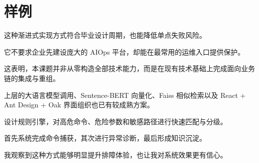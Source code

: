 \section{样例}

这种渐进式实现方式符合毕业设计周期，也能降低单点失败风险。

它不要求企业先建设庞大的 AIOps 平台，却能在最常用的运维入口提供保护。

这表明，本课题并非从零构造全部技术能力，而是在现有技术基础上完成面向业务链的集成与重组。

上层的大语言模型调用、Sentence-BERT 向量化、Faiss 相似检索以及 React + Ant Design + Oak 界面组织也已有较成熟方案。

设计规则引擎，对高危命令、危险参数和敏感路径进行快速匹配与分级。

首先系统完成命令捕获，其次进行异常诊断，最后形成知识沉淀。

我观察到这种方式能够明显提升排障体验，也让我对系统效果更有信心。
